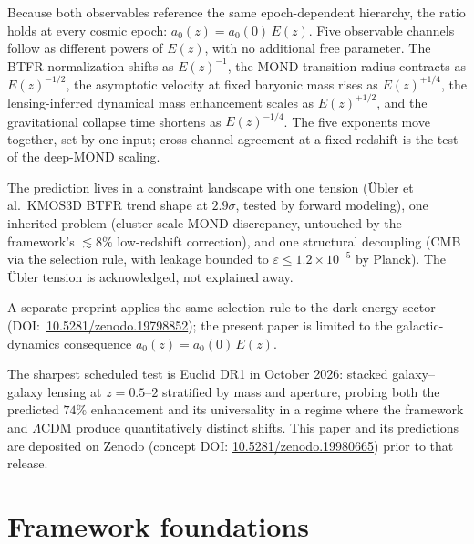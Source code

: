 \documentclass[11pt,a4paper]{article}
\numberwithin{equation}{section}
\numberwithin{table}{section}
\numberwithin{figure}{section}
\newcommand{\afid}{a_0}
\newcommand{\Ez}{E(z)}
\begin{document}
Because both observables reference the same epoch-dependent hierarchy,
the ratio holds at every cosmic epoch:
$\afid(z) = \afid(0)\,\Ez$. Five observable channels follow as
different powers of $\Ez$, with no additional free parameter. The BTFR
normalization shifts as $\Ez^{-1}$, the MOND transition radius
contracts as $\Ez^{-1/2}$, the asymptotic velocity at fixed baryonic
mass rises as $\Ez^{+1/4}$, the lensing-inferred dynamical mass
enhancement scales as $\Ez^{+1/2}$, and the gravitational collapse time
shortens as $\Ez^{-1/4}$. The five exponents move together, set by one
input; cross-channel agreement at a fixed redshift is the test of the
deep-MOND scaling.

The prediction lives in a constraint landscape with one tension
({\"U}bler et al.\ KMOS3D BTFR trend shape at $2.9\sigma$, tested by
forward modeling), one inherited problem
(cluster-scale MOND discrepancy, untouched by the framework's
$\lesssim 8\%$ low-redshift correction), and one structural decoupling
(CMB via the selection rule, with leakage bounded to
$\varepsilon \leq 1.2 \times 10^{-5}$ by Planck). The {\"U}bler tension
is acknowledged, not explained away.

A separate preprint applies the same selection rule to the dark-energy
sector
(DOI:~\href{https://doi.org/10.5281/zenodo.19798852}{10.5281/zenodo.19798852});
the present paper is limited to the galactic-dynamics consequence
$\afid(z) = \afid(0)\,\Ez$.

The sharpest scheduled test is Euclid DR1 in October 2026: stacked
galaxy--galaxy lensing at $z = 0.5$--$2$ stratified by mass and
aperture, probing both the predicted $74\%$ enhancement and its
universality in a regime where the framework and $\Lambda$CDM produce
quantitatively distinct shifts. This paper and its predictions are
deposited on Zenodo (concept DOI:
\href{https://doi.org/10.5281/zenodo.19980665}{10.5281/zenodo.19980665})
prior to that release.

\appendix
\renewcommand{\thesection}{\Alph{section}}
\renewcommand{\theequation}{\thesection.\arabic{equation}}
\renewcommand{\thetable}{\thesection.\arabic{table}}
\renewcommand{\thefigure}{\thesection.\arabic{figure}}
\setcounter{equation}{0}
\setcounter{table}{0}
\setcounter{figure}{0}

\section{Framework foundations}
\label{app:framework}
\end{document}
